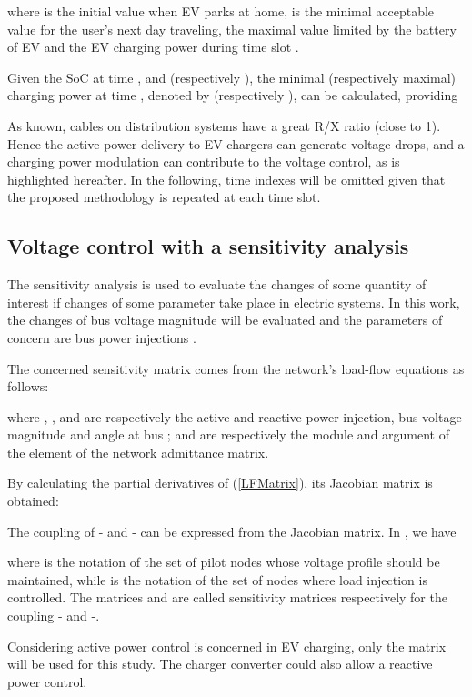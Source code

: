 \documentclass[journal]{IEEEtran}
\begin{document}
where  is the initial value when EV parks at home,  is the minimal acceptable value for the user's next day traveling,  the maximal value limited by the battery of EV and  the EV charging power during time slot .

Given the SoC at time , and  (respectively ), the minimal (respectively maximal) charging power at time , denoted by  (respectively ), can be calculated, providing  


As known, cables on distribution systems have a great R/X ratio (close to 1).  Hence the active power delivery to EV chargers can generate voltage drops, and a charging power modulation can contribute to the voltage control, as is highlighted hereafter. In the following, time indexes will be omitted given that the proposed methodology is repeated at each time slot.

\subsection{Voltage control with a sensitivity analysis}


The sensitivity analysis \cite{VanCutsem1998} is used to evaluate the changes of some quantity  of interest if changes of some parameter  take place in electric systems. In this work, the changes of bus voltage magnitude  will be evaluated and the parameters of concern are bus power injections .

The concerned sensitivity matrix comes from the network's load-flow equations as follows:

where , ,  and  are respectively the active and reactive power injection, bus voltage magnitude and angle at bus ;  and  are respectively the module and argument of the element  of the network admittance matrix.  

By calculating the partial derivatives of (\ref{LFMatrix}), its Jacobian matrix is obtained:

The coupling of - and - can be expressed from the Jacobian matrix. In \cite{He2012}, we have 

where  is the notation of the set of pilot nodes whose voltage profile should be maintained, while  is the notation of the set of nodes where load injection is controlled. The matrices  and  are called sensitivity matrices respectively for the coupling - and -.

Considering active power control is concerned in EV charging, only the matrix  will be used for this study. The charger converter could also allow a reactive power control. 
\end{document}
